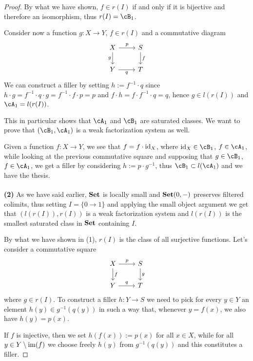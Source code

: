\documentclass[a4paper,11pt,openany]{scrartcl}
\begin{document}
\begin{proof}
    By what we have shown, $f\in r(I)$ if and only if it is bijective
    and therefore an isomorphism, thus $r(I)=\cB_1$.

    Consider now a function $g\colon X\rightarrow Y$, $f\in r(I)$ and a
    commutative diagram
    \[\begin{tikzcd}
	{X} & {S} \\
	{Y} & {T}
	\arrow["{g}"', from=1-1, to=2-1]
	\arrow["{f}", from=1-2, to=2-2]
	\arrow["{q}"', from=2-1, to=2-2]
	\arrow["{p}", from=1-1, to=1-2]
    \end{tikzcd}\]
    We can construct a filler by setting $h:=f^{-1}\cdot q$ since $h\cdot
    g=f^{-1}\cdot q\cdot g=f^{-1}\cdot f\cdot p=p$ and $f\cdot h=f\cdot
    f^{-1}\cdot q=q$, hence $g\in l(r(I))$ and $\cA_1=l(r(I))$.

    This in particular shows that $\cA_1$ and $\cB_1$ are saturated classes. We
    want to prove that $(\cB_1,\cA_1)$ is a weak factorization system as well.

    Given a function $f\colon X\rightarrow Y$, we see that $f=f\cdot\operatorname{id}_X$,
    where $\id_X\in\cB_1$, $f\in\cA_1$, while looking at the previous
    commutative square and supposing that $g\in\cB_1$, $f\in\cA_1$, we get a
    filler by considering $h:=p\cdot g^{-1}$, thus $\cB_1\subset l(\cA_1)$ and
    we have the thesis.\\
    \\
     \textbf{(2)} As we have said earlier, $\operatorname{\mathbf{Set}}$ is locally small and $\operatorname{\mathbf{Set}}(0,-)$
    preserves filtered colimits, thus setting $I=\{0\rightarrow 1\}$ and
    applying the small object argument we get that $(l(r(I)),r(I))$ is a weak
    factorization system and $l(r(I))$ is the smallest saturated class in $\operatorname{\mathbf{Set}}$
    containing $I$.

    By what we have shown in (1), $r(I)$ is the class of all surjective
    functions. Let's consider a commutative square
    \[
        \begin{tikzcd}
            X\ar[d, "f"]\ar[r, "p"]
            & S\ar[d, "g"] \\
            Y\ar[r, "q"]
            & T
        \end{tikzcd}
    \]
    where $g\in r(I)$. To construct a filler $h\colon Y\rightarrow S$ we need to
    pick for every $y\in Y$ an element $h(y)\in g^{-1}(q(y))$ in such a way that,
    whenever $y=f(x)$, we also have $h(y)=p(x)$.

    \noindent If $f$ is injective, then we
    set $h(f(x)):=p(x)$ for all $x\in X$, while for all $y\in Y\setminus \operatorname{im}(f)$
    we choose freely $h(y)$ from $g^{-1}(q(y))$ and this constitutes a filler.


\end{proof}
\end{document}
